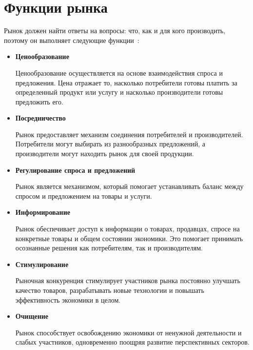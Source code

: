 \section{Функции рынка}
Рынок должен найти ответы на вопросы: что, как и для кого производить, поэтому он выполняет следующие функции~\cite{market}:
\begin{itemize}
	\item \textbf{Ценообразование} 
	
	Ценообразование осуществляется на основе взаимодействия спроса и предложения. 
	Цена отражает то, насколько потребители готовы платить за определенный продукт или услугу и насколько производители готовы предложить его.
	\item \textbf{Посредничество} 
	
	Рынок предоставляет механизм соединения потребителей и производителей. 
	Потребители могут выбирать из разнообразных предложений, а производители могут находить рынок для своей продукции.
	\item \textbf{Регулирование спроса и предложений}
	
	Рынок является механизмом, который помогает устанавливать баланс между спросом и предложением на товары и услуги.
	\item \textbf{Информирование}
	
	Рынок обеспечивает доступ к информации о товарах, продавцах, спросе на конкретные товары и общем состоянии экономики. 
	Это помогает принимать осознанные решения как потребителям, так и производителям.
	\item \textbf{Стимулирование} 
	
	Рыночная конкуренция стимулирует участников рынка постоянно улучшать качество товаров, разрабатывать новые технологии и повышать эффективность экономики в целом.
	\item \textbf{Очищение} 
	
	Рынок способствует освобождению экономики от ненужной деятельности и слабых участников, одновременно поощряя развитие перспективных секторов.
\end{itemize}
